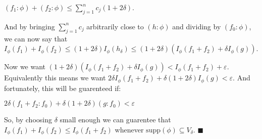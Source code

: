 \documentclass{book}
\newenvironment{myIndent}{%
   \begin{adjustwidth}{2.5em}{0em}%
}{%
   \end{adjustwidth}%
}
\newcommand{\supp}{\mathrm{supp}}
\newcommand{\retTwo}{\hfill\bigbreak}
\begin{document}
\begin{myIndent}
	{\centering$(f_1 : \phi) + (f_2 : \phi) \leq \sum_{j=1}^n c_j (1 + 2\delta)$.\retTwo\par}
	
	And by bringing $\sum_{j=1}^n c_j$ arbitrarily close to $(h : \phi)$ and dividing by $(f_0 : \phi)$, we can now say that $I_\phi(f_1) + I_\phi(f_2) \leq (1 + 2\delta)I_\phi(h_\delta) \leq (1 + 2\delta)(I_\phi(f_1 + f_2) + \delta I_\phi(g))$.\retTwo

	Now we want $(1 + 2\delta)(I_\phi(f_1 + f_2) + \delta I_\phi(g)) < I_\phi(f_1 + f_2) + \varepsilon$. Equivalently this means we want $2\delta I_\phi(f_1 + f_2) + \delta(1 + 2\delta) I_\phi(g) < \varepsilon$. And fortunately, this will be guarenteed if:

	{\centering $2\delta (f_1 + f_2 : f_0) + \delta(1 + 2\delta)(g : f_0) < \varepsilon$ \retTwo\par}

	So, by choosing $\delta$ small enough we can guarentee that $I_\phi(f_1) + I_\phi(f_2) \leq I_\phi(f_1 + f_2)$ whenever $\supp(\phi) \subseteq V_\delta$. $\blacksquare$\retTwo
\end{myIndent}
\end{document}
